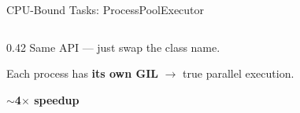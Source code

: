 \documentclass[aspectratio=169]{beamer}
\begin{document}
\begin{frame}[fragile]{CPU-Bound Tasks: ProcessPoolExecutor}
\begin{columns}
\begin{column}{0.42\textwidth}
            \vspace{0.3em}
            Same API --- just swap the class name.

            \vspace{0.3em}
            Each process has \textbf{its own GIL} $\rightarrow$ true parallel execution.

            \vspace{0.5em}
            \colorbox{classB!15}{\parbox{0.85\textwidth}{\centering
                \textbf{$\sim$4$\times$ speedup}
            }}
        \end{column}
    \end{columns}
\end{frame}

\end{document}
